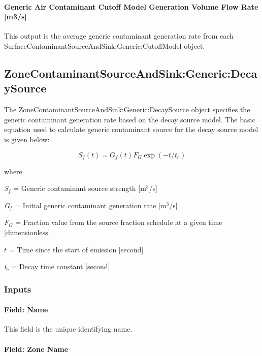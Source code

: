 \paragraph{Generic Air Contaminant Cutoff Model Generation Volume Flow Rate {[}m3/s{]}}\label{generic-air-contaminant-cutoff-model-generation-volume-flow-rate-m3s}

This output is the average generic contaminant generation rate from each Surface\-Contaminant\-Source\-And\-Sink:\-Generic:\-Cutoff\-Model object.

\subsection{ZoneContaminantSourceAndSink:Generic:DecaySource}\label{zonecontaminantsourceandsinkgenericdecaysource}

The ZoneContaminantSourceAndSink:Generic:DecaySource object specifies the generic contaminant generation rate based on the decay source model. The basic equation used to calculate generic contaminant source for the decay source model is given below:

\begin{equation}
{S_f}(t) = {G_f}(t){F_G}\exp ( - t/{t_c})
\end{equation}

where

\emph{S\(_{f}\)} = Generic contaminant source strength {[}m\(^{3}\)/s{]}

\emph{G\(_{f}\)} = Initial generic contaminant generation rate {[}m\(^{3}\)/s{]}

\emph{F\(_{G}\)} = Fraction value from the source fraction schedule at a given time {[}dimensionless{]}

\(t\) = Time since the start of emission {[}second{]}

\emph{t\(_{c}\)} = Decay time constant {[}second{]}

\subsubsection{Inputs}\label{inputs-14-006}

\paragraph{Field: Name}\label{field-name-14-004}

This field is the unique identifying name.

\paragraph{Field: Zone Name}\label{field-zone-name-5-002}


